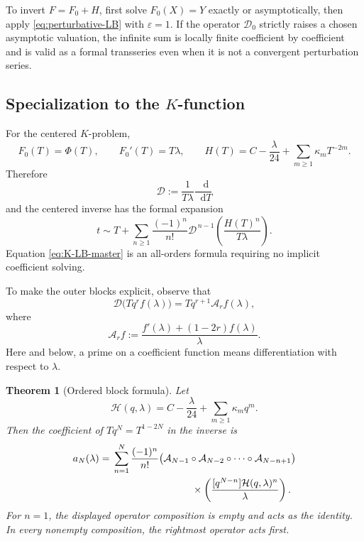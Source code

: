 \documentclass[11pt,oneside]{article}
\theoremstyle{plain}
\newtheorem{theorem}{Theorem}[section]
\theoremstyle{definition}
\theoremstyle{remark}
\newcommand{\dd}{\mathop{}\!\mathrm{d}}
\newcommand{\Acal}{\mathcal{A}}
\newcommand{\Hcal}{\mathcal{H}}
\begin{document}
\begin{methodbox}
To invert \(F=F_0+H\), first solve \(F_0(X)=Y\) exactly or asymptotically, then
apply \cref{eq:perturbative-LB} with \(\varepsilon=1\).  If the operator
\(\mathscr D_0\) strictly raises a chosen asymptotic valuation, the infinite
sum is locally finite coefficient by coefficient and is valid as a formal
transseries even when it is not a convergent perturbation series.
\end{methodbox}

\subsection{Specialization to the \(K\)-function}

For the centered \(K\)-problem,
\begin{equation}
 F_0(T)=\Phi(T),
 \qquad
 F_0'(T)=T\lambda,
 \qquad
 H(T)=C-\frac{\lambda}{24}+\sum_{m\ge1}\kappa_mT^{-2m}.
 \label{eq:K-F0-H}
\end{equation}
Therefore
\begin{equation}
 \mathscr D:=\frac1{T\lambda}\frac{\dd}{\dd T}
 \label{eq:K-D}
\end{equation}
and the centered inverse has the formal expansion
\begin{equation}
 t
 \sim T+\sum_{n\ge1}\frac{(-1)^n}{n!}
 \mathscr D^{\,n-1}
 \left(\frac{H(T)^n}{T\lambda}\right).
 \label{eq:K-LB-master}
\end{equation}
Equation \cref{eq:K-LB-master} is an all-orders formula requiring no implicit
coefficient solving.

To make the outer blocks explicit, observe that
\begin{equation}
 \mathscr D\bigl(Tq^r f(\lambda)\bigr)
 =Tq^{r+1}\Acal_r f(\lambda),
 \label{eq:D-block-action}
\end{equation}
where
\begin{equation}
 \Acal_r f
 :=\frac{f'(\lambda)+(1-2r)f(\lambda)}{\lambda}.
 \label{eq:Ar-def}
\end{equation}
Here and below, a prime on a coefficient function means differentiation with
respect to \(\lambda\).

\begin{theorem}[Ordered block formula]
\label{thm:block-formula}
Let
\begin{equation}
 \Hcal(q,\lambda)=C-\frac{\lambda}{24}
                   +\sum_{m\ge1}\kappa_mq^m.
 \label{eq:Hcal-repeated}
\end{equation}
Then the coefficient of \(Tq^N=T^{1-2N}\) in the inverse is
\begin{align}
 a_N(\lambda)
 ={}&\sum_{n=1}^{N}\frac{(-1)^n}{n!}
 \bigl(\Acal_{N-1}\circ\Acal_{N-2}\circ\cdots
        \circ\Acal_{N-n+1}\bigr)
 \notag\\
 &\hspace{28mm}\times
 \left(
   \frac{[q^{N-n}]\Hcal(q,\lambda)^n}{\lambda}
 \right).
 \label{eq:block-formula}
\end{align}
For \(n=1\), the displayed operator composition is empty and acts as the
identity.  In every nonempty composition, the rightmost operator acts first.
\end{theorem}
\end{document}
